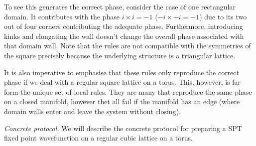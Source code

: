 \documentclass[a4paper,twocolumn,11pt]{quantumarticle}
\begin{document}
To see this generates the correct phase, consider the case of one rectangular domain. It contributes with the phase $i \times i =  - 1$ ($-i \times -i =  - 1$) due to its two out of four corners contributing the adequate phase. Furthermore, introducing kinks and elongating the wall doesn't change the overall phase associated with that domain wall. Note that the rules are not compatible with the symmetries of the square precisely because the underlying structure is a triangular lattice.

It is also imperative to emphasise that these rules only reproduce the correct phase if we deal with a regular square lattice on a torus.
This, however, is far form the unique set of local rules. They are many that reproduce the same phase on a closed manifold, however thet all fail if the manifold has an edge (where domain walls enter and leave the system without closing).

\emph{Concrete protocol.} We will describe the concrete protocol for preparing a SPT fixed point wavefunction on a regular cubic lattice on a torus. 
\end{document}
